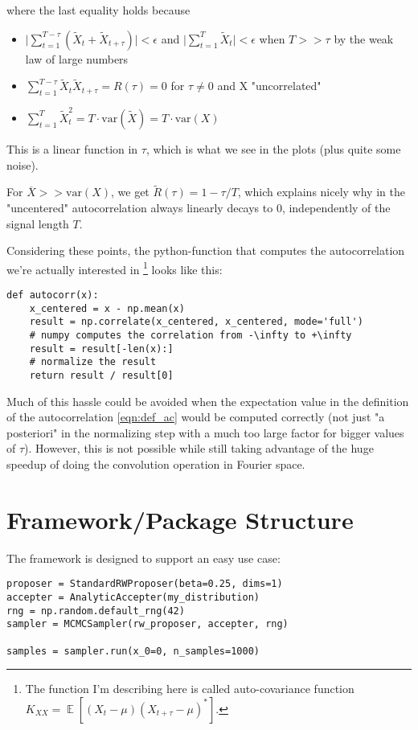 \documentclass[11pt]{article}
\newcommand{\E}[1]{{\mathop{\mathbb{E}}\left[ #1 \right]}}
\begin{document}
where the last equality holds because
\begin{itemize}
\item \(\lvert\sum_{t=1}^{T-\tau} (\tilde{X}_t + \tilde{X}_{t+\tau})\rvert < \epsilon\) and \(\lvert\sum_{t=1}^T \tilde{X}_t \rvert < \epsilon\)
when \(T >> \tau\) by the weak law of large numbers
\item \(\sum_{t=1}^{T-\tau}\tilde{X}_t \tilde{X}_{t+\tau} = R(\tau) = 0\) for \(\tau \neq 0\) and X "uncorrelated"
\item \(\sum_{t=1}^T \tilde{X}_t^2 = T \cdot \text{var}(\tilde{X}) = T \cdot\text{var}(X)\)
\end{itemize}

This is a linear function in \(\tau\), which is what we see in the plots (plus quite some noise).

For \(\overline{X} >> \text{var}(X)\), we get \(\tilde{R}(\tau) = 1 - \tau / T\), which explains nicely
why in the "uncentered" autocorrelation always linearly decays to 0, independently of the signal length \(T\).

Considering these points, the python-function that computes the autocorrelation we're actually interested
in \footnote{The function I'm describing here is called auto-covariance function \(K_{XX} = \E{(X_t - \mu) (X_{t+\tau} - \mu)^*}\).} looks like this:

\begin{verbatim}
def autocorr(x):
    x_centered = x - np.mean(x)
    result = np.correlate(x_centered, x_centered, mode='full')
    # numpy computes the correlation from -\infty to +\infty
    result = result[-len(x):]
    # normalize the result
    return result / result[0]
\end{verbatim}

Much of this hassle could be avoided when the expectation value in the definition of the autocorrelation
\ref{eqn:def_ac} would be computed correctly (not just "a posteriori" in the normalizing step with
a much too large factor for bigger values of \(\tau\)). However, this is not possible while still taking
advantage of the huge speedup of doing the convolution operation in Fourier space.

\section{Framework/Package Structure}
\label{sec:org48b88f5}
The framework is designed to support an easy use case:
\begin{verbatim}
proposer = StandardRWProposer(beta=0.25, dims=1)
accepter = AnalyticAccepter(my_distribution)
rng = np.random.default_rng(42)
sampler = MCMCSampler(rw_proposer, accepter, rng)

samples = sampler.run(x_0=0, n_samples=1000)
\end{verbatim}
\end{document}
